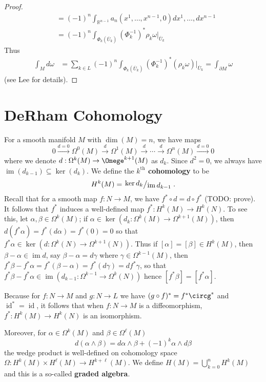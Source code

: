 \documentclass[11pt, a4paper]{memoir}
\DeclareMathOperator{\R}{{\mathbb{R}}}
\newcommand{\fto}[1]{\ensuremath{\xrightarrow{\scriptstyle{#1}}}}
\theoremstyle{change}
\theoremstyle{plain}
\theoremstyle{nonumberplain}
\newtheorem{proof}{Proof}
\DeclareMathOperator{\id}{id}
\DeclareMathOperator{\im}{im}
\newcommand{\quot}[2]{\mathchoice{\left.\raisebox{0.14em}{$#1$}\middle/\raisebox{-0.14em}{$#2$}\right.}
                                 {\left.\raisebox{0.08em}{$#1$}\middle/\raisebox{-0.08em}{$#2$}\right.}
                                 {\left.\raisebox{0.03em}{$#1$}\middle/\raisebox{-0.03em}{$#2$}\right.}
                                 {\left.\raisebox{0em}{$#1$}\middle/\raisebox{0em}{$#2$}\right.}}
\numberwithin{equation}{section}
\begin{document}
\begin{proof}
\begin{align*}
                                                                  &= (-1)^n\int_{\R^{n-1}}a_n(x^1,\ldots,x^{n-1},0)dx^1,\ldots,dx^{n-1}\\
                                                                  &= (-1)^n\int_{\Phi_k(\overline{U}_k)}(\Phi_k^{-1})^*\rho_k\omega|_{\overline{U}_k}
    \end{align*}
    Thus
    \begin{align*}
        \int_Md\omega &= \sum_{k\in L}(-1)^n\int_{\Phi_k(\overline{U}_k)}(\Phi_k^{-1})^*(\rho_k\omega)|_{\overline{U}_k}=\int_{\partial M}\omega
    \end{align*}
    (see Lee for details).
\end{proof}
\section{DeRham Cohomology}
For a smooth manifold $M$ with $\dim(M)=n$, we have maps
\begin{equation*}
    0\fto{d=0}\Omega^0(M)\fto{d}\Omega^1(M)\fto{d}\cdots\fto{d}\Omega^n(M)\fto{d=0}0
\end{equation*}
where we denote $d:\Omega^k(M)\to\Omege^{k+1}(M)$ as $d_k$.
Since $d^2=0$, we always have $\im(d_{k-1})\subseteq\ker(d_k)$.
We define the \textbf{$k^\text{th}$ cohomology} to be
\begin{equation*}
    H^k(M)=\quot{\ker d_k}{\im d_{k-1}}.
\end{equation*}
Recall that for a smooth map $f:N\to M$, we have $f^*\circ d=d\circ f^*$ (TODO: prove).
It follows that $f^*$ induces a well-defined map $f^*:H^k(M)\to H^k(N)$.
To see this, let $\alpha,\beta\in\Omega^k(M)$; if $\alpha\in\ker(d_k:\Omega^k(M)\to\Omega^{k+1}(M))$, then $d(f^*\alpha)=f^*(d\alpha)=f^*(0)=0$ so that $f^*\alpha\in\ker(d:\Omega^k(N)\to\Omega^{k+1}(N))$.
Thus if $[\alpha]=[\beta]\in H^k(M)$, then $\beta-\alpha\in\im d$, say $\beta-\alpha=d\gamma$ where $\gamma\in\Omega^{k-1}(M)$, then $f^*\beta-f^*\alpha=f^*(\beta-\alpha)=f^*(d\gamma)=df^*\gamma$, so that $f^*\beta-f^*\alpha\in\im(d_{k-1}:\Omega^{k-1}\to\Omega^k(N))$ hence $[f^*\beta]=[f^*\alpha]$.

Because for $f:N\to M$ and $g:N\to L$ we have $(g\circ f)^*=f^*\circg^*$ and $\id^*=\id$, it follows that when $f:N\to M$ is a diffeomorphism, $f^*:H^k(M)\to H^k(N)$ is an isomorphism.

Moreover, for $\alpha\in\Omega^k(M)$ and $\beta\in\Omega^\ell(M)$
\begin{equation*}
    d(\alpha\wedge\beta)=d\alpha\wedge\beta+(-1)^k\alpha\wedge d\beta
\end{equation*}
the wedge product is well-defined on cohomology space $\Omega:H^k(M)\times H^\ell(M)\to H^{k+\ell}(M)$.
We define $H(M)=\bigcup_{k=0}^n H^k(M)$ and this is a so-called \textbf{graded algebra}.
\end{document}
